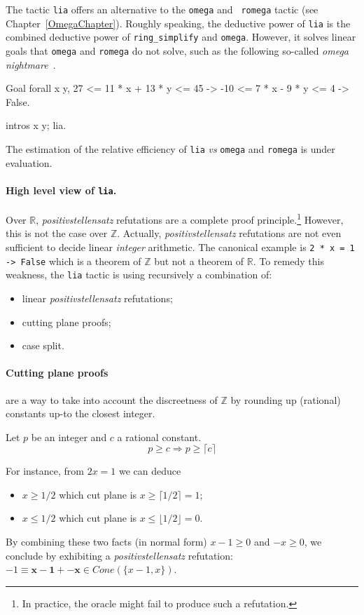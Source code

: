 \label{sec:lia}

The tactic {\tt lia} offers an alternative to the {\tt omega} and {\tt
  romega} tactic (see Chapter~\ref{OmegaChapter}).
%
Roughly speaking, the deductive power of {\tt lia} is the combined deductive power of {\tt ring\_simplify} and {\tt omega}.
%
However, it solves linear goals that {\tt omega} and {\tt romega} do not solve, such as the
following so-called \emph{omega nightmare}~\cite{TheOmegaPaper}.
\begin{coq_example*}
Goal forall x y,
  27 <= 11 * x + 13 * y <= 45 ->
  -10 <= 7 * x - 9 * y <= 4 ->  False.
\end{coq_example*}
\begin{coq_eval}
intros x y; lia.
\end{coq_eval}
The estimation of the relative efficiency of {\tt lia} \emph{vs} {\tt omega}
and {\tt romega} is under evaluation.

\paragraph{High level view of {\tt lia}.}
Over $\mathbb{R}$, \emph{positivstellensatz} refutations are a complete
proof principle.\footnote{In practice, the oracle might fail to produce
  such a refutation.}
%
However, this is not the case over $\mathbb{Z}$.
%
Actually, \emph{positivstellensatz} refutations are not even sufficient
to decide linear \emph{integer} arithmetic.
%
The canonical example is {\tt 2 * x = 1 -> False} which is a theorem of $\mathbb{Z}$ but not a theorem of $\mathbb{R}$.
%
To remedy this weakness, the {\tt lia} tactic is using recursively a combination of:
%
\begin{itemize}
\item linear \emph{positivstellensatz} refutations;
\item cutting plane proofs;
\item case split.
\end{itemize}

\paragraph{Cutting plane proofs} are a way to take into account the discreetness of $\mathbb{Z}$ by rounding up
(rational) constants up-to the closest integer. 
%
\begin{theorem}
  Let $p$ be an integer and $c$ a rational constant.
  \[
  p \ge c \Rightarrow p \ge \lceil c \rceil
  \]
\end{theorem}
For instance, from $2 x = 1$ we can deduce
\begin{itemize}
\item $x \ge 1/2$ which cut plane is $ x \ge \lceil 1/2 \rceil = 1$;
\item $ x \le 1/2$ which cut plane is $ x \le \lfloor 1/2 \rfloor = 0$.
\end{itemize}
By combining these two facts (in normal form) $x - 1 \ge 0$ and $-x \ge
0$, we conclude by exhibiting a \emph{positivstellensatz} refutation: $-1
\equiv \mathbf{x-1} + \mathbf{-x} \in \mathit{Cone}(\{x-1,x\})$.

